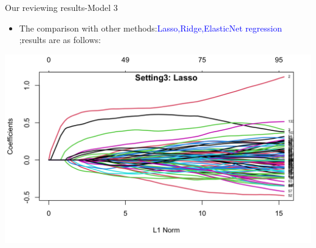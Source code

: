 \documentclass{beamer}
\begin{document}
\begin{frame}{Our reviewing results-Model 3}
    \begin{itemize}
        \item The comparison with other methods:\textcolor{blue}{Lasso,Ridge,ElasticNet regression} ;results are as follows:
    \end{itemize}
    \includegraphics[scale=0.2]{3.3.png}
\end{frame}
\end{document}
